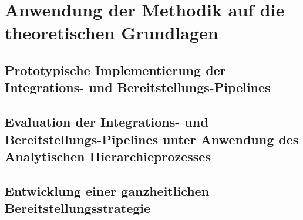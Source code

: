 \section{Anwendung der Methodik auf die theoretischen Grundlagen}

\subsection{Prototypische Implementierung der Integrations- und Bereitstellungs-Pipelines}

\subsection{Evaluation der Integrations- und Bereitstellungs-Pipelines unter Anwendung des Analytischen Hierarchieprozesses}

\subsection{Entwicklung einer ganzheitlichen Bereitstellungsstrategie}
